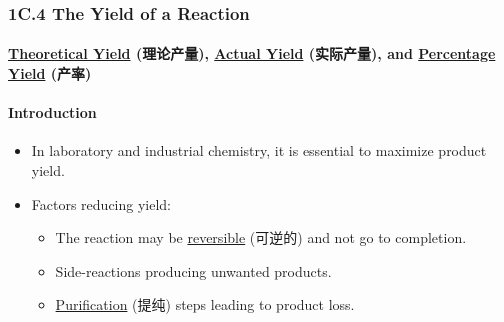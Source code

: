 
\subsubsection{1C.4 The Yield of a Reaction}
\paragraph{\underline{Theoretical Yield} (理论产量), \underline{Actual Yield} (实际产量), and \underline{Percentage Yield} (产率)}
\paragraph{Introduction}
\begin{itemize}
    \item In laboratory and industrial chemistry, it is essential to maximize product yield.
    \item Factors reducing yield:
    \begin{itemize}
        \item The reaction may be \underline{reversible} (可逆的) and not go to completion.
        \item Side-reactions producing unwanted products.
        \item \underline{Purification} (提纯) steps leading to product loss.
    \end{itemize}
\end{itemize}

